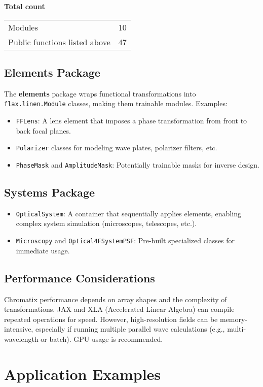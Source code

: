 \documentclass[a4paper,12pt]{report}
\begin{document}
\bigskip
\noindent\textbf{Total count}\\
\begin{tabular}{@{}lr@{}}\toprule
Modules & 10\\
Public functions listed above & 47\\\bottomrule
\end{tabular}


\section{Elements Package}
The \textbf{elements} package wraps functional transformations into \texttt{flax.linen.Module} classes, making them trainable modules. Examples:
\begin{itemize}
    \item \texttt{FFLens}: A lens element that imposes a phase transformation from front to back focal planes.
    \item \texttt{Polarizer} classes for modeling wave plates, polarizer filters, etc.
    \item \texttt{PhaseMask} and \texttt{AmplitudeMask}: Potentially trainable masks for inverse design.
\end{itemize}

\section{Systems Package}
\begin{itemize}
    \item \texttt{OpticalSystem}: A container that sequentially applies elements, enabling complex system simulation (microscopes, telescopes, etc.).
    \item \texttt{Microscopy} and \texttt{Optical4FSystemPSF}: Pre-built specialized classes for immediate usage.
\end{itemize}

\section{Performance Considerations}
Chromatix performance depends on array shapes and the complexity of transformations. JAX and XLA (Accelerated Linear Algebra) can compile repeated operations for speed. However, high-resolution fields can be memory-intensive, especially if running multiple parallel wave calculations (e.g., multi-wavelength or batch). GPU usage is recommended.

\chapter{Application Examples}
\end{document}
